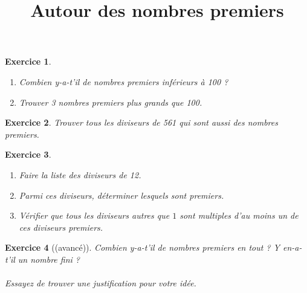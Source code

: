 \documentclass[a4paper]{article}
\title{Autour des nombres premiers}
\date{}
\theoremstyle{exostyle}
\newtheorem{exercice}{Exercice}
\begin{document}
\maketitle

\begin{exercice}
	\begin{enumerate}
		\item Combien y-a-t'il de nombres premiers inférieurs à 100 ?
		\item Trouver 3 nombres premiers plus grands que 100.
	\end{enumerate}
\end{exercice}

\begin{exercice}
	Trouver tous les diviseurs de 561 qui sont aussi des nombres premiers.
\end{exercice}

\begin{exercice}
	\begin{enumerate}
		\item Faire la liste des diviseurs de 12.
		\item Parmi ces diviseurs, déterminer lesquels sont premiers.
		\item Vérifier que tous les diviseurs autres que $1$ sont multiples d'au moins un de ces diviseurs premiers.
	\end{enumerate}
\end{exercice}

\begin{exercice}[(avancé)]
	Combien y-a-t'il de nombres premiers en tout ? Y en-a-t'il un nombre fini ? \\ \\
	Essayez de trouver une justification pour votre idée.
\end{exercice}
\end{document}
